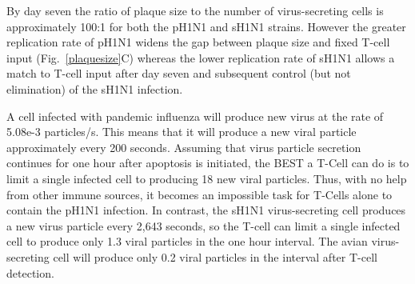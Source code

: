 \documentclass[10pt]{article}
\begin{document}
By day seven the ratio of plaque size to the number of virus-secreting cells is approximately 100:1 for both the pH1N1 and sH1N1 strains.  However the greater replication rate of pH1N1 widens the gap between plaque size and fixed T-cell input (Fig.~\ref{plaquesize}C) whereas the lower replication rate of sH1N1 allows a match to T-cell input after day seven and subsequent control (but not elimination) of the sH1N1 infection.

A cell infected with pandemic influenza will produce new virus at the rate of 5.08e-3 particles/s.  This means that it will produce a new viral particle approximately every 200 seconds.  Assuming that virus particle secretion continues for one hour after apoptosis is initiated, the BEST a T-Cell can do is to limit a single infected cell to producing 18 new viral particles.  Thus, with no help from other immune sources, it becomes an impossible task for T-Cells alone to contain the pH1N1 infection.  In contrast, the sH1N1 virus-secreting cell produces a new virus particle every 2,643 seconds, so the T-cell can limit a single infected cell to produce only 1.3 viral particles in the one hour interval.  The avian virus-secreting cell will produce only 0.2 viral particles in the interval after T-cell detection. 
\end{document}
